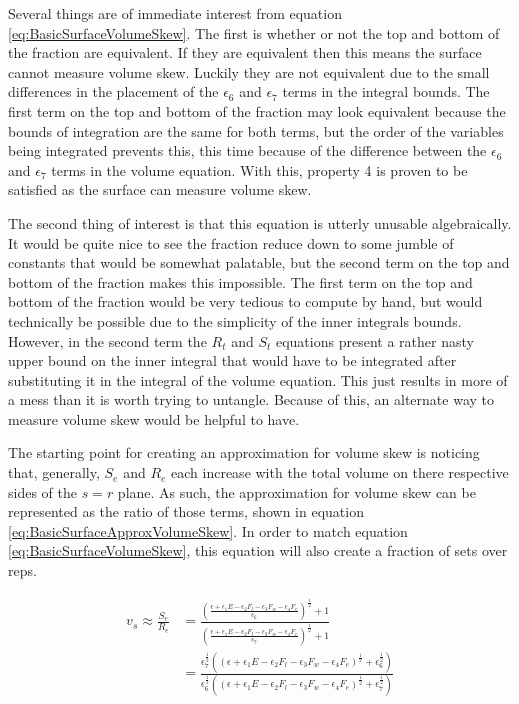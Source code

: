 Several things are of immediate interest from equation \ref{eq:BasicSurfaceVolumeSkew}. The first is whether or not the top and bottom of the fraction are equivalent. If they are equivalent then this means the surface cannot measure volume skew. Luckily they are not equivalent due to the small differences in the placement of the $\epsilon_6$ and $\epsilon_7$ terms in the integral bounds. The first term on the top and bottom of the fraction may look equivalent because the bounds of integration are the same for both terms, but the order of the variables being integrated prevents this, this time because of the difference between the $\epsilon_6$ and $\epsilon_7$ terms in the volume equation. With this, property 4 is proven to be satisfied as the surface can measure volume skew.

The second thing of interest is that this equation is utterly unusable algebraically. It would be quite nice to see the fraction reduce down to some jumble of constants that would be somewhat palatable, but the second term on the top and bottom of the fraction makes this impossible. The first term on the top and bottom of the fraction would be very tedious to compute by hand, but would technically be possible due to the simplicity of the inner integrals bounds. However, in the second term the $R_t$ and $S_t$ equations present a rather nasty upper bound on the inner integral that would have to be integrated after substituting it in the integral of the volume equation. This just results in more of a mess than it is worth trying to untangle. Because of this, an alternate way to measure volume skew would be helpful to have.

The starting point for creating an approximation for volume skew is noticing that, generally, $S_e$ and $R_e$ each increase with the total volume on there respective sides of the $s=r$ plane. As such, the approximation for volume skew can be represented as the ratio of those terms, shown in equation \ref{eq:BasicSurfaceApproxVolumeSkew}. In order to match equation \ref{eq:BasicSurfaceVolumeSkew}, this equation will also create a fraction of sets over reps.

\begin{equation}
	\label{eq:BasicSurfaceApproxVolumeSkew}
	\begin{split}
		v_s \approx \frac{S_e}{R_e} & =\frac{
			\left(
				\frac{
					\epsilon+
					\epsilon_1E-
					\epsilon_2F_l-
					\epsilon_3F_w-
					\epsilon_4F_e
				}{
					\epsilon_6
				}
			\right)^{\frac{1}{2}}+1
		}{
			\left(
				\frac{
					\epsilon+
					\epsilon_1E-
					\epsilon_2F_l-
					\epsilon_3F_w-
					\epsilon_4F_e
				}{
					\epsilon_7
				}
			\right)^{\frac{1}{2}}+1
		} \\
		& = \frac{
			\epsilon_7^{\frac{1}{2}} \left(
				\left(
					\epsilon+
					\epsilon_1E-
					\epsilon_2F_l-
					\epsilon_3F_w-
					\epsilon_4F_e
				\right)^{\frac{1}{2}}+
				\epsilon_6^{\frac{1}{2}}
			\right)		
		}{
			\epsilon_6^{\frac{1}{2}} \left(
				\left(
					\epsilon+
					\epsilon_1E-
					\epsilon_2F_l-
					\epsilon_3F_w-
					\epsilon_4F_e
				\right)^{\frac{1}{2}}+
				\epsilon_7^{\frac{1}{2}}
			\right)		
		}
	\end{split}
\end{equation}

